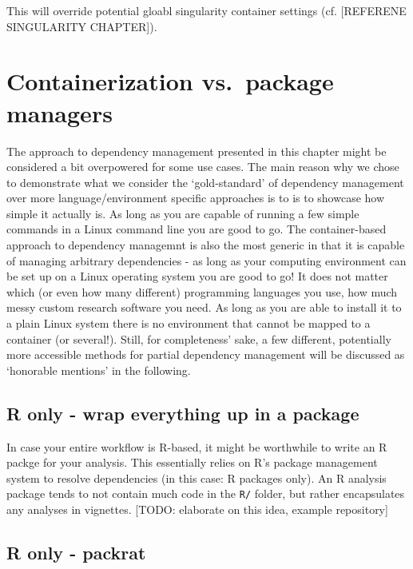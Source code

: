 \documentclass[]{book}
\begin{document}
This will override potential gloabl singularity container settings (cf.
{[}REFERENE SINGULARITY CHAPTER{]}).

\section{Containerization vs.~package
managers}\label{containerization-vs.package-managers}

The approach to dependency management presented in this chapter might be
considered a bit overpowered for some use cases. The main reason why we
chose to demonstrate what we consider the `gold-standard' of dependency
management over more language/environment specific approaches is to is
to showcase how simple it actually is. As long as you are capable of
running a few simple commands in a Linux command line you are good to
go. The container-based approach to dependency managemnt is also the
most generic in that it is capable of managing arbitrary dependencies -
as long as your computing environment can be set up on a Linux operating
system you are good to go! It does not matter which (or even how many
different) programming languages you use, how much messy custom research
software you need. As long as you are able to install it to a plain
Linux system there is no environment that cannot be mapped to a
container (or several!). Still, for completeness' sake, a few different,
potentially more accessible methods for partial dependency management
will be discussed as `honorable mentions' in the following.

\subsection{R only - wrap everything up in a
package}\label{r-only---wrap-everything-up-in-a-package}

In case your entire workflow is R-based, it might be worthwhile to write
an R packge for your analysis. This essentially relies on R's package
management system to resolve dependencies (in this case: R packages
only). An R analysis package tends to not contain much code in the
\texttt{R/} folder, but rather encapsulates any analyses in vignettes.
{[}TODO: elaborate on this idea, example repository{]}

\subsection{R only - packrat}\label{r-only---packrat}
\end{document}
